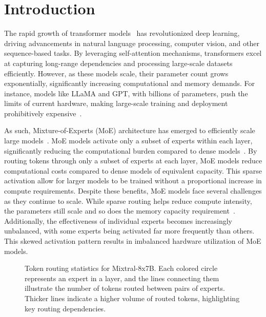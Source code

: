 \section{Introduction}
The rapid growth of transformer models~\cite{bert,gpt2,gpt3,gemma,llama,t5} has revolutionized deep learning, driving advancements in natural language processing, computer vision, and other sequence-based tasks.
% 
By leveraging self-attention mechanisms, transformers excel at capturing long-range dependencies and processing large-scale datasets efficiently.
% 
However, as these models scale, their parameter count grows exponentially, significantly increasing computational and memory demands.
% 
For instance, models like LLaMA and GPT, with billions of parameters, push the limits of current hardware, making large-scale training and deployment prohibitively expensive~\cite{llama, gpt3}.

As such, Mixture-of-Experts (MoE) architecture has emerged to efficiently scale large models~\cite{mixtral, switchtransformer, gshard, cai2024survey}. 
%
MoE models activate only a subset of experts within each layer, significantly reducing the computational burden compared to dense models~\cite{shazeer2017outrageously}.
%
By routing tokens through only a subset of experts at each layer, MoE models reduce computational costs compared to dense models of equivalent capacity.
%
This sparse activation allow for larger models to be trained without a proportional increase in compute requirements. 
%
Despite these benefits, MoE models face several challenges as they continue to scale. 
%
While sparse routing helps reduce compute intensity, the parameters still scale and so does the memory capacity requirement~\cite{mcsmoe,deepspeed, switchtransformer, fastermoe, fastmoe, cai2024shortcut,hwang2024pre}.
%
Additionally, the effectiveness of individual experts becomes increasingly unbalanced, with some experts being activated far more frequently than others. 
%
%
This skewed activation pattern results in imbalanced hardware utilization of MoE models.

\begin{figure}
    \centering
    
    \vspace{-1em}
    \caption{Token routing statistics for Mixtral-8x7B. Each colored circle represents an expert in a layer, and the lines connecting them illustrate the number of tokens routed between pairs of experts. Thicker lines indicate a higher volume of routed tokens, highlighting key routing dependencies.
    }
    \label{fig:intro-tokenrouting}
\end{figure}


